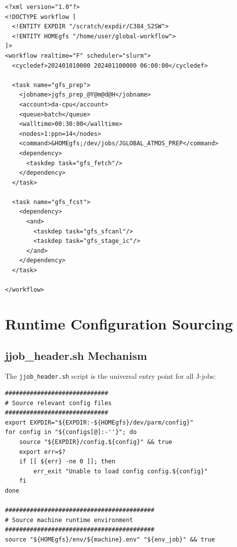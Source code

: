 \documentclass[11pt,letterpaper]{article}
\begin{document}
\begin{lstlisting}[style=xmlstyle, title=Rocoto XML (Simplified)]
<?xml version="1.0"?>
<!DOCTYPE workflow [
  <!ENTITY EXPDIR "/scratch/expdir/C384_S2SW">
  <!ENTITY HOMEgfs "/home/user/global-workflow">
]>
<workflow realtime="F" scheduler="slurm">
  <cycledef>202401010000 202401100000 06:00:00</cycledef>
  
  <task name="gfs_prep">
    <jobname>jgfs_prep_@Y@m@d@H</jobname>
    <account>da-cpu</account>
    <queue>batch</queue>
    <walltime>00:30:00</walltime>
    <nodes>1:ppn=14</nodes>
    <command>&HOMEgfs;/dev/jobs/JGLOBAL_ATMOS_PREP</command>
    <dependency>
      <taskdep task="gfs_fetch"/>
    </dependency>
  </task>
  
  <task name="gfs_fcst">
    <dependency>
      <and>
        <taskdep task="gfs_sfcanl"/>
        <taskdep task="gfs_stage_ic"/>
      </and>
    </dependency>
  </task>
  
</workflow>
\end{lstlisting}


\section{Runtime Configuration Sourcing}

\subsection{jjob\_header.sh Mechanism}

The \texttt{jjob\_header.sh} script is the universal entry point for all J-jobs:

\begin{lstlisting}[style=bashstyle, title=jjob\_header.sh (Key Section)]
#############################
# Source relevant config files
#############################
export EXPDIR="${EXPDIR:-${HOMEgfs}/dev/parm/config}"
for config in "${configs[@]:-''}"; do
    source "${EXPDIR}/config.${config}" && true
    export err=$?
    if [[ ${err} -ne 0 ]]; then
        err_exit "Unable to load config config.${config}"
    fi
done

##########################################
# Source machine runtime environment
##########################################
source "${HOMEgfs}/env/${machine}.env" "${env_job}" && true
\end{lstlisting}
\end{document}
